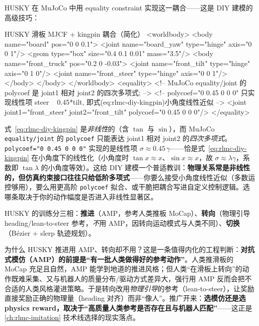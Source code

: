 HUSKY 在 MuJoCo 中用 equality constraint 实现这一耦合——这是 DIY 建模的高级技巧：

\begin{codebox}[text]{HUSKY 滑板 MJCF + kingpin 耦合（简化）}
<worldbody>
  <body name="board" pos="0 0 0.1">
    <joint name="board_yaw" type="hinge" axis="0 0 1"/>
    <geom type="box" size="0.4 0.1 0.01" mass="3.5"/>
    <body name="front_truck" pos="0.2 0 -0.03">
      <joint name="front_tilt"  type="hinge" axis="0 1 0"/>
      <joint name="front_steer" type="hinge" axis="0 0 1"/>
    </body>
  </body>
</worldbody>
<equality>
  <!-- MuJoCo equality/joint 的 polycoef 是 joint1 相对 joint2 的四次多项式; -->
  <!-- polycoef="0 0.45 0 0 0" 只实现线性项 steer ~ 0.45*tilt, 即式(eq:rlmc-diy-kingpin)小角度线性近似 -->
  <joint joint1="front_steer" joint2="front_tilt" polycoef="0 0.45 0 0 0"/>
</equality>
\end{codebox}

\begin{insight}\label{ins:rlmc-diy-husky-approx}
式~\eqref{eq:rlmc-diy-kingpin} 是\emph{非线性}的（含 $\tan$ 与 $\sin$），而 MuJoCo \verb|equality/joint| 的 \verb|polycoef| 只能表达 joint1 相对 joint2 的\emph{四次多项式}。\verb|polycoef="0 0.45 0 0 0"| 实现的是线性项 $\sigma\approx 0.45\,\gamma$——恰是式~\eqref{eq:rlmc-diy-kingpin} 在小角度下的线性化（小角度时 $\tan x\approx x$、$\sin x\approx x$，故 $\sigma\approx \lambda\gamma$，系数即 $\tan\lambda$ 的小角度等效）。这给 DIY 建模一个普适教训：\textbf{物理关系常是非线性的，但仿真约束接口往往只给低阶多项式}——你要么接受小角度线性近似（多数运控够用），要么用更高阶 \verb|polycoef| 拟合、或干脆把耦合写进自定义控制逻辑。选哪条取决于你的动作幅度是否进入非线性显著区。
\end{insight}

HUSKY 的训练分三相：\textbf{推进}（AMP，参考人类推板 MoCap）、\textbf{转向}（物理引导 heading/lean-to-steer 参考，\emph{不}用 AMP，因转向运动模式与人类不同）、\textbf{切换}（Bézier + slerp 轨迹规划）。

\begin{insight}\label{ins:rlmc-diy-amp-scope}
为什么 HUSKY 推进用 AMP、转向却不用？这是一条值得内化的工程判断：\textbf{对抗式模仿（AMP）的前提是“有一批人类做得好的参考动作”}。人类推滑板的 MoCap 充足且自然，AMP 能学到地道的推进风格；但人类“在滑板上转向”的动作既难采集、又与机器人的质量分布/驱动方式差异大，强行用 AMP 反而会把不合适的人类风格灌进策略。于是转向改用\emph{物理引导}的参考（lean-to-steer），让奖励直接奖励正确的物理量（heading 对齐）而非“像人”。推广开来：\textbf{选模仿还是选 physics reward，取决于“高质量人类参考是否存在且与机器人匹配”}——这正是 \cref{ch:rlmc-imitation} 技术线选择的现实落点。
\end{insight}


